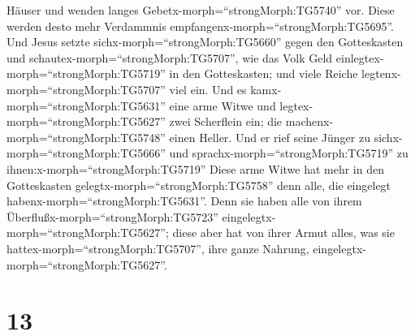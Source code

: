 Häuser und wenden langes Gebetx-morph=``strongMorph:TG5740'' vor. Diese
werden desto mehr Verdammnis empfangenx-morph=``strongMorph:TG5695''.
 Und Jesus setzte sichx-morph=``strongMorph:TG5660'' gegen
den Gotteskasten und schautex-morph=``strongMorph:TG5707'', wie das Volk
Geld einlegtex-morph=``strongMorph:TG5719'' in den Gotteskasten; und
viele Reiche legtenx-morph=``strongMorph:TG5707'' viel ein.
 Und es kamx-morph=``strongMorph:TG5631'' eine arme Witwe
und legtex-morph=``strongMorph:TG5627'' zwei Scherflein ein; die
machenx-morph=``strongMorph:TG5748'' einen Heller.  Und er
rief seine Jünger zu sichx-morph=``strongMorph:TG5666'' und
sprachx-morph=``strongMorph:TG5719'' zu
ihnen:x-morph=``strongMorph:TG5719'' Diese arme Witwe hat mehr in den
Gotteskasten gelegtx-morph=``strongMorph:TG5758'' denn alle, die
eingelegt habenx-morph=``strongMorph:TG5631''.  Denn sie
haben alle von ihrem Überflußx-morph=``strongMorph:TG5723''
eingelegtx-morph=``strongMorph:TG5627''; diese aber hat von ihrer Armut
alles, was sie hattex-morph=``strongMorph:TG5707'', ihre ganze Nahrung,
eingelegtx-morph=``strongMorph:TG5627''.

\hypertarget{section-12}{%
\section{13}\label{section-12}}

